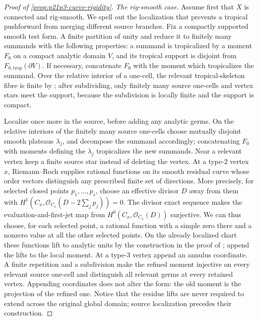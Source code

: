 \begin{proof}[Proof of \cref{prop:p21p3-curve-rigidity}]
\smallskip
\emph{The rig-smooth case.}
Assume first that \(X\) is connected and rig-smooth.  We spell out the
localization that prevents a tropical pushforward from merging different
source branches.  Fix a compactly supported smooth test form.  A finite
partition of unity and \cite[Lemma~12.3.6]{CLD25} reduce it to finitely
many summands with the following properties: a summand is tropicalized by
a moment \(F_0\) on a compact analytic domain \(V\), and its tropical
support is disjoint from \(F_{0,\mathrm{trop}}(\partial V)\).  If necessary,
concatenate \(F_0\) with the moment which tropicalizes the summand.  Over
the relative interior of a one-cell, the relevant tropical-skeleton fibre
is finite by
\cite[Corollary~3.18 and Remark~3.20]{GJR26}; after subdividing, only
finitely many source one-cells and vertex stars meet the support, because
the subdivision is locally finite and the support is compact.

Localize once more in the source, before adding any analytic germs.  On
the relative interiors of the finitely many source one-cells choose
mutually disjoint smooth plateaus \(\lambda_j\), and decompose the summand
accordingly; concatenating \(F_0\) with moments defining the
\(\lambda_j\) tropicalizes the new summands.  Near a relevant vertex keep
a finite source star instead of deleting the vertex.  At a type-$2$
vertex \(x\), Riemann--Roch supplies rational functions on its smooth
residual curve whose order vectors distinguish any prescribed finite set
of directions.  More precisely, for selected closed points
\(p_1,\ldots,p_s\), choose an effective divisor \(D\) away from them with
\(H^1(C_x,\mathcal O_{C_x}(D-2\sum_jp_j))=0\).  The divisor exact sequence
makes the evaluation-and-first-jet map from
\(H^0(C_x,\mathcal O_{C_x}(D))\) surjective.  We can thus choose, for each
selected point, a rational function with a simple zero there and a
nonzero value at all the other selected points.  On the already localized
chart these functions lift to analytic units by the construction in the
proof of \cite[Lemma~6.14]{GJR26}; append the lifts to the local moment.
At a type-$3$ vertex append an annulus coordinate.  A finite repetition
and a subdivision make the refined moment injective on every relevant
source one-cell and distinguish all relevant germs at every retained
vertex.  Appending coordinates does not alter the form: the old moment is
the projection of the refined one.  Notice that the residue lifts are
never required to extend across the original global domain; source
localization precedes their construction.


\end{proof}

